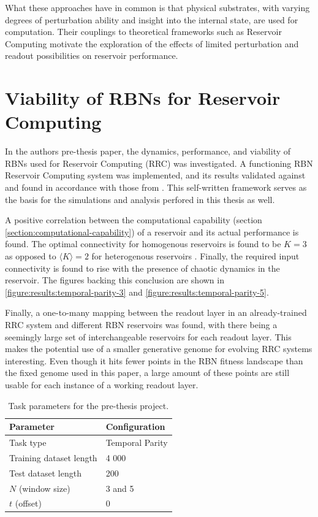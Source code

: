 What these approaches have in common is that physical substrates,
with varying degrees of perturbation ability and insight into the internal state,
are used for computation.
Their couplings to theoretical frameworks such as Reservoir Computing motivate the exploration of the effects of limited perturbation and readout possibilities on reservoir performance.

\section{Viability of RBNs for Reservoir Computing}
\label{section:pre-thesis-project}

In the authors pre-thesis paper, the dynamics, performance, and viability of RBNs used for Reservoir Computing (RRC) was investigated.
A functioning RBN Reservoir Computing system was implemented,
and its results validated against and found in accordance with those from \cite{rbn-reservoir}.
This self-written framework serves as the basis for the simulations and analysis perfored in this thesis as well.

A positive correlation between the computational capability (section \ref{section:computational-capability}) of a reservoir and its actual performance is found.
The optimal connectivity for homogenous reservoirs is found to be $K=3$ as opposed to $\langle K \rangle = 2$ for heterogenous reservoirs \cite{rbn-reservoir}.
Finally, the required input connectivity is found to rise with the presence of chaotic dynamics in the reservoir.
The figures backing this conclusion are shown in \ref{figure:results:temporal-parity-3} and \ref{figure:results:temporal-parity-5}.

Finally, a one-to-many mapping between the readout layer in an already-trained RRC system and different RBN reservoirs was found,
with there being a seemingly large set of interchangeable reservoirs for each readout layer.
This makes the potential use of a smaller generative genome for evolving RRC systems interesting.
Even though it hits fewer points in the RBN fitness landscape than the fixed genome used in this paper,
a large amount of these points are still usable for each instance of a working readout layer.

\begin{table}[ht]
    \centering
    \caption{Task parameters for the pre-thesis project.}
    \label{table:pre-thesis-tasks}
    \begin{tabular}{ll}
        \hline
        \textbf{Parameter} & \textbf{Configuration} \\
        \hline
        \hline
        Task type               & Temporal Parity \\
        Training dataset length & 4 000                       \\
        Test dataset length     & 200                         \\
        $N$ (window size)       & 3 and 5                     \\
        $t$ (offset)            & 0 \\
        \hline
    \end{tabular}
\end{table}

